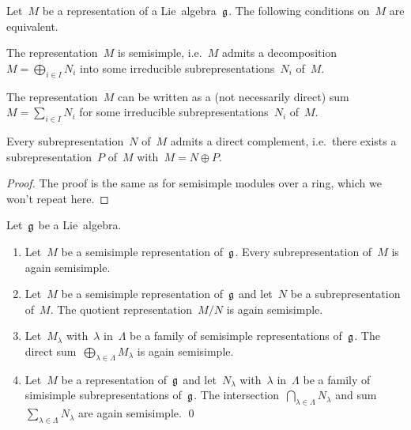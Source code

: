 \begin{proposition}
	Let~$M$ be a representation of a Lie~algebra~$\mathfrak{g}$.
	The following conditions on~$M$ are equivalent.
	\begin{equivalenceslist}
		\item
			The representation~$M$ is semisimple, i.e.~$M$ admits a decomposition~$M = \bigoplus_{i \in I} N_i$ into some irreducible subrepresentations~$N_i$ of~$M$.
		\item
			The representation~$M$ can be written as a (not necessarily direct) sum~$M = \sum_{i \in I} N_i$ for some irreducible subrepresentations~$N_i$ of~$M$.
		\item
			Every subrepresentation~$N$ of~$M$ admits a direct complement, i.e.\ there exists a subrepresentation~$P$ of~$M$ with~$M = N \oplus P$.
	\end{equivalenceslist}
\end{proposition}


\begin{proof}
	The proof is the same as for semisimple modules over a ring, which we won’t repeat here.
\end{proof}


\begin{corollary}
	Let~$\mathfrak{g}$ be a Lie~algebra.
	\begin{enumerate}
		\item
			Let~$M$ be a semisimple representation of~$\mathfrak{g}$.
			Every subrepresentation of~$M$ is again semisimple.
		\item
			Let~$M$ be a semisimple representation of~$\mathfrak{g}$ and let~$N$ be a subrepresentation of~$M$.
			The quotient representation~$M/N$ is again semisimple.
		\item
			Let~$M_\lambda$ with~$\lambda$ in~$\Lambda$ be a family of semisimple representations of~$\mathfrak{g}$.
			The direct sum~$\bigoplus_{\lambda \in \Lambda} M_\lambda$ is again semisimple.
		\item
			Let~$M$ be a representation of~$\mathfrak{g}$ and let~$N_\lambda$ with~$\lambda$ in~$\Lambda$ be a family of simisimple subrepresentations of~$\mathfrak{g}$.
			The intersection~$\bigcap_{\lambda \in \Lambda} N_\lambda$ and sum~$\sum_{\lambda \in \Lambda} N_\lambda$ are again semisimple.
		\qed
	\end{enumerate}
\end{corollary}


